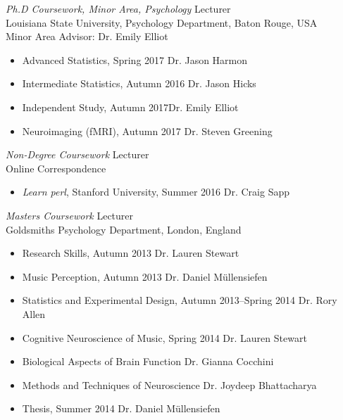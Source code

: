 {\sl Ph.D Coursework, Minor Area, Psychology} \hfill Lecturer \\
Louisiana State University, Psychology Department, Baton Rouge, USA \hfill \\
Minor Area Advisor: Dr. Emily Elliot
\begin{itemize} \itemsep -2pt %
\item Advanced Statistics, Spring 2017 \hfill Dr. Jason Harmon
\item Intermediate Statistics, Autumn 2016 \hfill Dr. Jason Hicks 
\item Independent Study, Autumn 2017\hfill Dr. Emily Elliot
\item Neuroimaging (fMRI), Autumn 2017 \hfill Dr. Steven Greening 
\end{itemize}

{\sl Non-Degree Coursework} \hfill Lecturer \\
Online Correspondence \hfill 
\begin{itemize} \itemsep -2pt %
\item \emph{Learn perl}, Stanford University, Summer 2016 \hfill Dr. Craig Sapp
\end{itemize}

{\sl Masters Coursework} \hfill Lecturer \\
Goldsmiths Psychology Department, London, England \hfill 
\begin{itemize} \itemsep -2pt %
\item Research Skills, Autumn 2013 \hfill Dr. Lauren Stewart
\item Music Perception, Autumn 2013 \hfill Dr. Daniel M\"{u}llensiefen
\item Statistics and Experimental Design, Autumn 2013--Spring 2014 \hfill Dr. Rory Allen
\item Cognitive Neuroscience of Music, Spring 2014 \hfill Dr. Lauren Stewart  
\item Biological Aspects of Brain Function \hfill Dr. Gianna Cocchini
\item Methods and Techniques of Neuroscience \hfill Dr. Joydeep Bhattacharya
\item Thesis, Summer 2014 \hfill Dr. Daniel M\"{u}llensiefen 
\end{itemize}

\vspace{0.2in} %
\vspace{0.2in} %
\newpage
